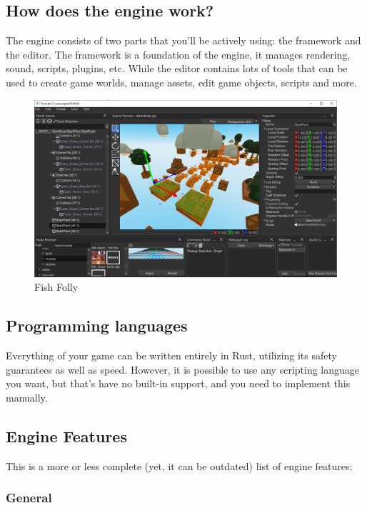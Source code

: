 \documentclass[
]{book}
\theoremstyle{definition}
\theoremstyle{definition}
\theoremstyle{definition}
\theoremstyle{definition}
\theoremstyle{remark}
\begin{document}
\subsection{How does the engine work?}\label{how-does-the-engine-work}

The engine consists of two parts that you'll be actively using: the framework and the editor. The framework is a foundation of the engine, it manages rendering, sound, scripts, plugins, etc. While the editor contains lots of tools that can be used to create game worlds, manage assets, edit game objects, scripts and more.

\begin{figure}
\centering
\includegraphics{images/introduction_editor.png}
\caption{Fish Folly}
\end{figure}

\subsection{Programming languages}\label{programming-languages}

Everything of your game can be written entirely in Rust, utilizing its safety guarantees as well as speed. However, it is possible to use any scripting language you want, but that's have no built-in support, and you need to implement this manually.

\subsection{Engine Features}\label{engine-features}

This is a more or less complete (yet, it can be outdated) list of engine features:

\subsubsection{General}\label{general}
\end{document}
